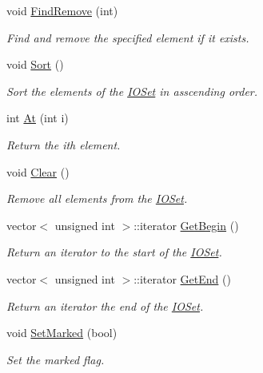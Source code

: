 \begin{DoxyCompactItemize}
void \hyperlink{class_i_o_set_a7e135f27326a102ab45ec56b33f8c5c3}{FindRemove} (int)
\begin{DoxyCompactList}\small\item\em Find and remove the specified element if it exists. \item\end{DoxyCompactList}\item 
void \hyperlink{class_i_o_set_aa840da94162188f037e18152b7ddbc5d}{Sort} ()
\begin{DoxyCompactList}\small\item\em Sort the elements of the \hyperlink{class_i_o_set}{IOSet} in asscending order. \item\end{DoxyCompactList}\item 
int \hyperlink{class_i_o_set_a260b6fe08d622da8938b01f63221f230}{At} (int i)
\begin{DoxyCompactList}\small\item\em Return the ith element. \item\end{DoxyCompactList}\item 
void \hyperlink{class_i_o_set_ad9258715a1cdd1d29453326193ac78d6}{Clear} ()
\begin{DoxyCompactList}\small\item\em Remove all elements from the \hyperlink{class_i_o_set}{IOSet}. \item\end{DoxyCompactList}\item 
vector$<$ unsigned int $>$::iterator \hyperlink{class_i_o_set_a35dbca9814fa6b9d663b73decf446435}{GetBegin} ()
\begin{DoxyCompactList}\small\item\em Return an iterator to the start of the \hyperlink{class_i_o_set}{IOSet}. \item\end{DoxyCompactList}\item 
vector$<$ unsigned int $>$::iterator \hyperlink{class_i_o_set_a7353bb13a1e5726be3aed1eff5d3970d}{GetEnd} ()
\begin{DoxyCompactList}\small\item\em Return an iterator the end of the \hyperlink{class_i_o_set}{IOSet}. \item\end{DoxyCompactList}\item 
void \hyperlink{class_i_o_set_adf83505da322e2b78f2d80605e777de6}{SetMarked} (bool)
\begin{DoxyCompactList}\small\item\em Set the marked flag. \item\end{DoxyCompactList}\item 

\end{DoxyCompactItemize}
